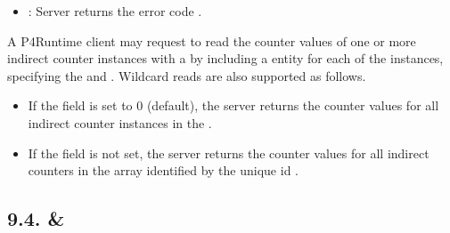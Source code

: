 \documentclass[11pt]{article}
\begin{document}
{\begin{itemize}[noitemsep,topsep=\mdcompacttopsep]
\item{}: Server returns the error code .%
\end{itemize}%

\noindent{}A P4Runtime client may request to read the counter values of one or more
indirect counter instances with a  by including a 
entity for each of the instances, specifying the  and
. Wildcard reads are also supported as follows.%

\begin{itemize}%

\item{}
If the  field is set to 0 (default), the server returns the
counter values for all indirect counter instances in the .%

\item{}
If the  field is not set, the server returns the counter values for all
indirect counters in the array identified by the unique id .%
\end{itemize}%

\subsection{9.4.\hspace*{0.5em} \& }\label{sec-meterentry-directmeterentry}%

}
\end{document}
